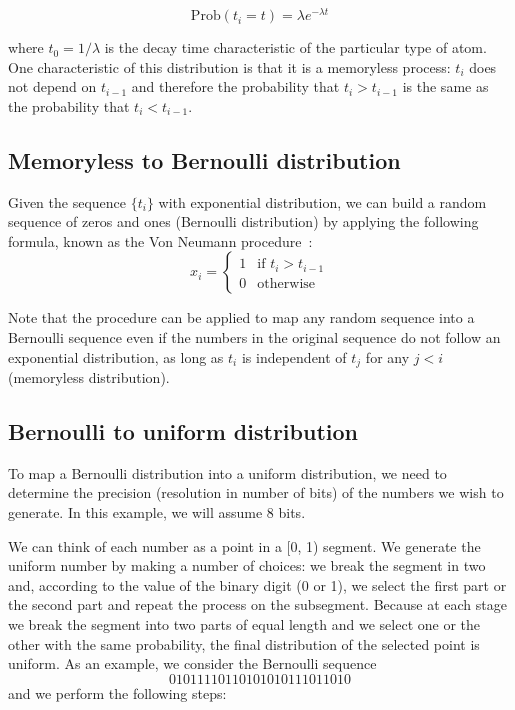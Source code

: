 \documentclass[justified, sixbynine]{tufte-book}
\theoremstyle{plain}%
\newtheorem * {corollary}{Corollary}
\theoremstyle{definition}
\theoremstyle{remark}
\newtheorem * {remark}{Remark}
\newtheorem * {note}{Note}
\begin{document}
\begin{fullwidth}
\begin{equation}
\textrm{Prob}(t_i = t)=\lambda e^{-\lambda t}
\end{equation}

where $t_0=1/\lambda $ is the decay time characteristic of the particular
type of atom. One characteristic of this distribution is that it is a memoryless process: $t_i$ does not depend on $t_{i-1}$ and therefore the probability that $t_i>t_{i-1}$ is the same as the probability that $t_i<t_{i-1}$.

\goodbreak\subsection{Memoryless to Bernoulli distribution}


Given the sequence $\{t_i\}$ with exponential distribution, we can build a
random sequence of zeros and ones (Bernoulli distribution) by applying the following formula, known as the Von Neumann procedure~\cite{bits}:
\begin{equation}
x_i=\left\{
\begin{array}{ll}
1 & \text{if }t_{i}>t_{i-1} \\
0 & \text{otherwise}
\end{array}
\right.
\end{equation}

Note that the procedure can be applied to map any random sequence into
a Bernoulli sequence even if the numbers in the original sequence do not
follow an exponential distribution, as long as $t_i$ is independent of $t_j$
for any $j<i$ (memoryless distribution).

\goodbreak\subsection{Bernoulli to uniform distribution}


To map a Bernoulli distribution into a uniform distribution, we need
to determine the precision (resolution in number of bits) of the numbers we wish
to generate. In this example, we will assume 8 bits.

We can think of each number as a point in a [0, 1) segment. We generate the
uniform number by making a number of choices: we break the segment in two
and, according to the value of the binary digit (0 or 1), we select the first
part or the second part and repeat the process on the subsegment. Because
at each stage we break the segment into two parts of equal length and we
select one or the other with the same probability, the final distribution of
the selected point is uniform. As an example, we consider the Bernoulli
sequence
\begin{equation}
01011110110101010111011010
\end{equation}
and we perform the following steps:


\end{fullwidth}
\end{document}
